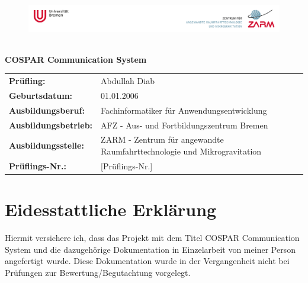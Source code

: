 \documentclass[11pt,a4paper]{article}
\begin{document}
\thispagestyle{empty}

\begin{figure}[H]
    \hspace*{-2.0cm}\vspace*{2cm}\includegraphics[height=2.2cm]{image1.png}
\end{figure}

\vspace{3cm}

\begin{center}
    {\Huge \textbf{COSPAR Communication System}}
\end{center}

\vfill

\begin{center}
    \begin{tabular}{ll}
        \textbf{Prüfling:} & Abdullah Diab \\[0.5em]
        \textbf{Geburtsdatum:} & 01.01.2006 \\[0.5em]
        \textbf{Ausbildungsberuf:} & Fachinformatiker für Anwendungsentwicklung \\[0.5em]
        \textbf{Ausbildungsbetrieb:} & AFZ - Aus- und Fortbildungszentrum Bremen \\[0.5em]
        \textbf{Ausbildungsstelle:} & ZARM - Zentrum für angewandte Raumfahrttechnologie und Mikrogravitation \\[0.5em]
        \textbf{Prüflings-Nr.:} & [Prüflings-Nr.] \\
    \end{tabular}
\end{center}

\vspace{2cm}

\newpage

\section*{Eidesstattliche Erklärung}
\thispagestyle{empty}

Hiermit versichere ich, dass das Projekt mit dem Titel \glqq COSPAR Communication System\grqq{} und die dazugehörige Dokumentation in Einzelarbeit von meiner Person angefertigt wurde. Diese Dokumentation wurde in der Vergangenheit nicht bei Prüfungen zur Bewertung/Begutachtung vorgelegt.
\end{document}
